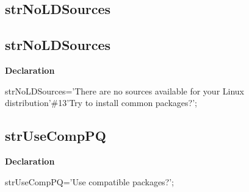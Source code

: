 \documentclass{report}
\newif\ifpdf
\begin{document}
\subsection*{\large{\textbf{strNoLDSources}}\normalsize\hspace{1ex}\hrulefill}
\else
\subsection*{strNoLDSources}
\fi
\label{trstrings-strNoLDSources}
\begin{list}{}{
\setlength{\itemindent}{0cm}
\setlength{\listparindent}{0cm}
\setlength{\leftmargin}{\evensidemargin}
\addtolength{\leftmargin}{\tmplength}
\settowidth{\labelsep}{X}
\addtolength{\leftmargin}{\labelsep}
\setlength{\labelwidth}{\tmplength}
}
\item[\textbf{Declaration}\hfill]
\ifpdf
\begin{flushleft}
\fi
\begin{ttfamily}
strNoLDSources='There are no sources available for your Linux distribution'{\#}13'Try to install common packages?';\end{ttfamily}

\ifpdf
\end{flushleft}
\fi

\end{list}
\ifpdf
\subsection*{\large{\textbf{strUseCompPQ}}\normalsize\hspace{1ex}\hrulefill}
\else
\subsection*{strUseCompPQ}
\fi
\label{trstrings-strUseCompPQ}
\begin{list}{}{
\setlength{\itemindent}{0cm}
\setlength{\listparindent}{0cm}
\setlength{\leftmargin}{\evensidemargin}
\addtolength{\leftmargin}{\tmplength}
\settowidth{\labelsep}{X}
\addtolength{\leftmargin}{\labelsep}
\setlength{\labelwidth}{\tmplength}
}
\item[\textbf{Declaration}\hfill]
\ifpdf
\begin{flushleft}
\fi
\begin{ttfamily}
strUseCompPQ='Use compatible packages?';\end{ttfamily}

\ifpdf
\end{flushleft}
\fi

\end{list}
\ifpdf
\end{document}
